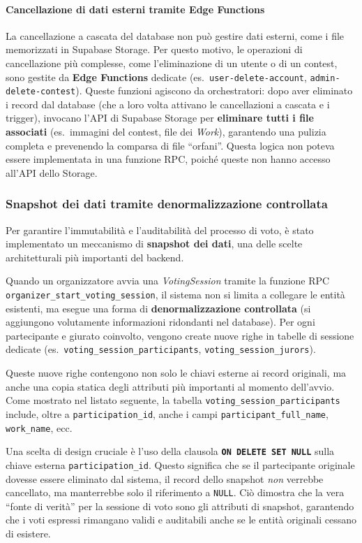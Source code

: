 \paragraph{Cancellazione di dati esterni tramite Edge Functions}
La cancellazione a cascata del database non può gestire dati esterni, come i file memorizzati in Supabase Storage.
Per questo motivo, le operazioni di cancellazione più complesse, come l'eliminazione di un utente o di un contest, sono gestite da \textbf{Edge Functions} dedicate (es.\ \texttt{user-delete-account}, \texttt{admin-delete-contest}). Queste funzioni agiscono da orchestratori: dopo aver eliminato i record dal database (che a loro volta attivano le cancellazioni a cascata e i trigger), invocano l'API di Supabase Storage per \textbf{eliminare tutti i file associati} (es.\ immagini del contest, file dei \emph{Work}), garantendo una pulizia completa e prevenendo la comparsa di file ``orfani''.
Questa logica non poteva essere implementata in una funzione RPC, poiché queste non hanno accesso all'API dello Storage.

\subsubsection{Snapshot dei dati tramite denormalizzazione controllata}
Per garantire l'immutabilità e l'auditabilità del processo di voto, è stato implementato un meccanismo di \textbf{snapshot dei dati}, una delle scelte architetturali più importanti del backend.

Quando un organizzatore avvia una \emph{VotingSession} tramite la funzione RPC \texttt{organizer\_start\_voting\_session}, il sistema non si limita a collegare le entità esistenti, ma esegue una forma di \textbf{denormalizzazione controllata} (si aggiungono volutamente informazioni ridondanti nel database).
Per ogni partecipante e giurato coinvolto, vengono create nuove righe in tabelle di sessione dedicate (es.\ \texttt{voting\_session\_participants}, \texttt{voting\_session\_jurors}).

Queste nuove righe contengono non solo le chiavi esterne ai record originali, ma anche una copia statica degli attributi più importanti al momento dell'avvio.
Come mostrato nel listato seguente, la tabella \texttt{voting\_session\_participants} include, oltre a \texttt{participation\_id}, anche i campi \texttt{participant\_full\_name}, \texttt{work\_name}, ecc.

Una scelta di design cruciale è l'uso della clausola \textbf{\texttt{ON DELETE SET NULL}} sulla chiave esterna \texttt{participation\_id}.
Questo significa che se il partecipante originale dovesse essere eliminato dal sistema, il record dello snapshot \emph{non} verrebbe cancellato, ma manterrebbe solo il riferimento a \texttt{NULL}.
Ciò dimostra che la vera ``fonte di verità'' per la sessione di voto sono gli attributi di snapshot, garantendo che i voti espressi rimangano validi e auditabili anche se le entità originali cessano di esistere.

